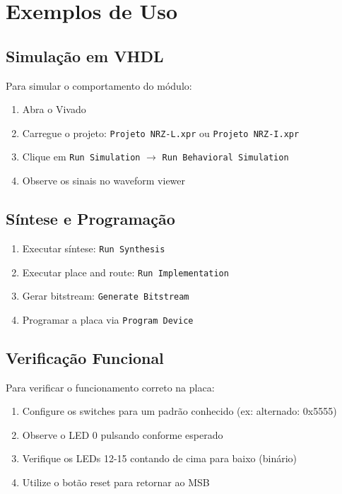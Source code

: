 \documentclass[11pt,a4paper]{article}
\begin{document}
\section{Exemplos de Uso}

\subsection{Simulação em VHDL}

Para simular o comportamento do módulo:

\begin{enumerate}
    \item Abra o Vivado
    \item Carregue o projeto: \texttt{Projeto NRZ-L.xpr} ou \texttt{Projeto NRZ-I.xpr}
    \item Clique em \texttt{Run Simulation} $\rightarrow$ \texttt{Run Behavioral Simulation}
    \item Observe os sinais no waveform viewer
\end{enumerate}

\subsection{Síntese e Programação}

\begin{enumerate}
    \item Executar síntese: \texttt{Run Synthesis}
    \item Executar place and route: \texttt{Run Implementation}
    \item Gerar bitstream: \texttt{Generate Bitstream}
    \item Programar a placa via \texttt{Program Device}
\end{enumerate}

\subsection{Verificação Funcional}

Para verificar o funcionamento correto na placa:

\begin{enumerate}
    \item Configure os switches para um padrão conhecido (ex: alternado: 0x5555)
    \item Observe o LED 0 pulsando conforme esperado
    \item Verifique os LEDs 12-15 contando de cima para baixo (binário)
    \item Utilize o botão reset para retornar ao MSB
\end{enumerate}
\end{document}
